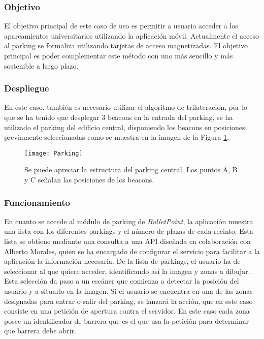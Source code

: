 \subsubsection{Objetivo}

El objetivo principal de este caso de uso es permitir a usuario acceder a los aparcamientos universitarios utilizando la aplicación móvil. Actualmente el acceso al parking se formaliza utilizando tarjetas de acceso magnetizadas. El objetivo principal es poder complementar este método con uno más sencillo y más sostenible a largo plazo. 

\subsubsection{Despliegue}

En este caso, también es necesario utilizar el algoritmo de trilateración, por lo que se ha tenido que desplegar 3 beacons en la entrada del parking, se ha utilizado el parking del edificio central, disponiendo los beacons en posiciones previamente seleccionadas como se muestra en la imagen de la Figura \ref{fig:parking}.

\begin{figure}[H]
	\centering
	\texttt{[image: Parking]}
	\label{fig:parking}
	\caption{Se puede apreciar la estructura del parking central. Los puntos A, B y C señalan las posiciones de los beacons.}
\end{figure}

\subsubsection{Funcionamiento}


En cuanto se accede al módulo de parking de \textit{BulletPoint}, la aplicación muestra una lista con los diferentes parkings y el número de plazas de cada recinto. Esta lista se obtiene mediante una consulta a una API diseñada en colaboración con Alberto Morales, quien se ha encargado de configurar el servicio para facilitar a la aplicación la información necesaria. De la lista de parkings, el usuario ha de seleccionar al que quiere acceder, identificando así la imagen y zonas a dibujar. Esta selección da paso a un escáner que comienza a detectar la posición del usuario y a situarlo en la imagen. Si el usuario se encuentra en una de las zonas designadas para entrar o salir del parking, se lanzará la acción, que en este caso consiste en una petición de apertura contra el servidor. En este caso cada zona posee un identificador de barrera que es el que usa la petición para determinar que barrera debe abrir. 


